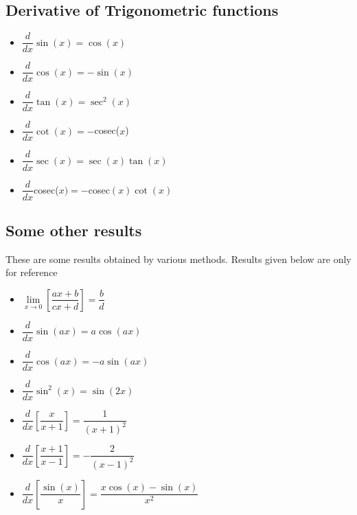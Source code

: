 \documentclass{article}
\begin{document}
\subsection{Derivative of Trigonometric functions}
\begin{itemize}
  \item $\dfrac{d}{dx}\sin(x) = \cos(x)$
  \item $\dfrac{d}{dx}\cos(x) = -\sin(x)$
  \item $\dfrac{d}{dx}\tan(x) = \sec^2(x)$
  \item $\dfrac{d}{dx}\cot(x) = -$cosec($x$)
  \item $\dfrac{d}{dx}\sec(x) = \sec(x)\tan(x)$
  \item $\dfrac{d}{dx}$cosec($x) = -$cosec$(x)\cot(x)$
\end{itemize}

\subsection{Some other results}
\par These are some results obtained by various methods. Results given below are only for reference
\begin{itemize}
  \item $\lim\limits_{x \to 0}\left[\dfrac{ax + b}{cx + d}\right] = \dfrac{b}{d}$
  \item $\dfrac{d}{dx}\sin(ax) = a\cos(ax)$
  \item $\dfrac{d}{dx}\cos(ax) = -a\sin(ax)$
  \item $\dfrac{d}{dx}\sin^2(x) = \sin(2x)$
  \item $\dfrac{d}{dx}\left[\dfrac{x}{x+1}\right] = \dfrac{1}{(x+1)^2}$
  \item $\dfrac{d}{dx}\left[\dfrac{x+1}{x-1}\right] = -\dfrac{2}{(x-1)^2}$
  \item $\dfrac{d}{dx}\left[\dfrac{\sin(x)}{x}\right] = \dfrac{x\cos(x) - \sin(x)}{x^2}$


\end{itemize}
\end{document}
